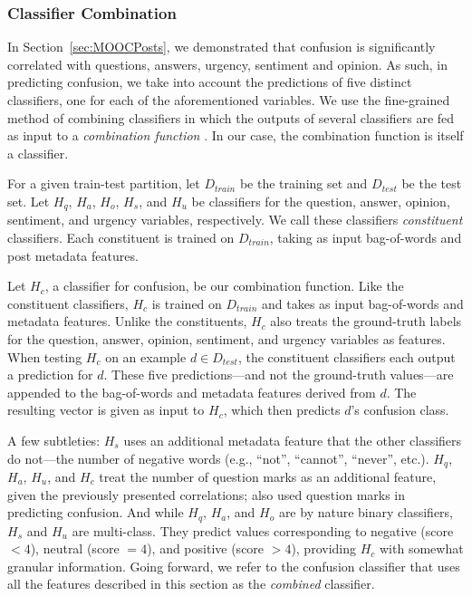 \documentclass{edm_template}
\begin{document}
\subsubsection{Classifier Combination}
In Section~\ref{sec:MOOCPosts}, we demonstrated that confusion is significantly correlated with questions, answers, urgency, sentiment and opinion. As such, in predicting confusion, we take into account the predictions of five distinct classifiers, one for each of the aforementioned variables. We use the fine-grained method of combining classifiers in which the outputs of several classifiers are fed as input to a \emph{combination function} \cite{bennett2005combination}. In our case, the combination function is itself a classifier.

For a given train-test partition, let $D_{train}$ be the training set and $D_{test}$ be the test set. Let $H_{q}$, $H_{a}$, $H_{o}$, $H_{s}$, and $H_{u}$ be classifiers for the question, answer, opinion, sentiment, and urgency variables, respectively. We call these classifiers \emph{constituent} classifiers. Each constituent is trained on $D_{train}$, taking as input bag-of-words and post metadata features.

Let $H_{c}$, a classifier for confusion, be our combination function. Like the constituent classifiers, $H_{c}$ is trained on $D_{train}$ and takes as input bag-of-words and metadata features. Unlike the constituents, $H_{c}$ also treats the ground-truth labels for the question, answer, opinion, sentiment, and urgency variables as features. When testing $H_{c}$ on an example $d \in D_{test}$, the constituent classifiers each output a prediction for $d$. These five predictions---and not the ground-truth values---are appended to the bag-of-words and metadata features derived from $d$. The resulting vector is given as input to $H_{c}$, which then predicts $d$'s confusion class.

A few subtleties: $H_{s}$ uses an additional metadata feature that the other classifiers do not---the number of negative words (e.g., ``not'', ``cannot'', ``never'', etc.). $H_{q}$, $H_{a}$, $H_{u}$, and $H_{c}$ treat the number of question marks as an additional feature, given the previously presented correlations; \cite{wen2015confusion} also used question marks in predicting confusion. And while $H_{q}$, $H_{a}$, and $H_{o}$ are by nature binary classifiers, $H_{s}$ and $H_{u}$ are multi-class. They predict values corresponding to negative (score $< 4$), neutral (score $= 4$), and positive (score $> 4$), providing $H_{c}$ with somewhat granular information. Going forward, we refer to the confusion classifier that uses all the features
described in this section as the \emph{combined} classifier. 
\end{document}
